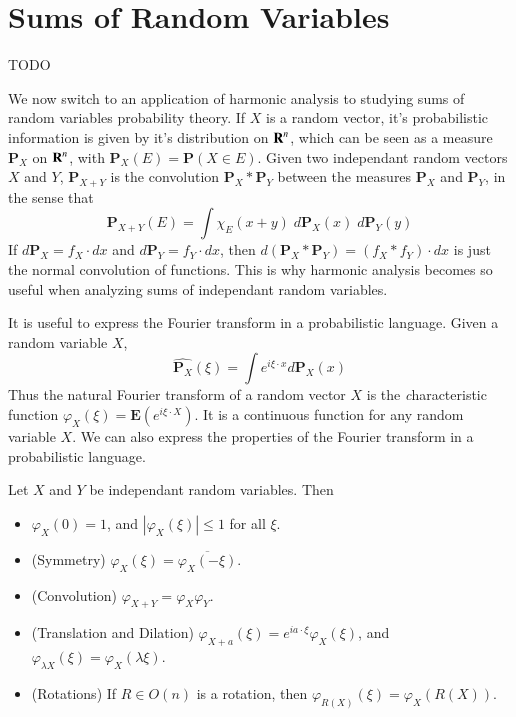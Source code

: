 \section{Sums of Random Variables}

TODO

We now switch to an application of harmonic analysis to studying sums of random variables probability theory. If $X$ is a random vector, it's probabilistic information is given by it's distribution on $\operatorname{\mathbf{R}}^n$, which can be seen as a measure $\mathbf{P}_X$ on $\operatorname{\mathbf{R}}^n$, with $\mathbf{P}_X(E) = \mathbf{P}(X \in E)$. Given two independant random vectors $X$ and $Y$, $\mathbf{P}_{X+Y}$ is the convolution $\mathbf{P}_X * \mathbf{P}_Y$ between the measures $\mathbf{P}_X$ and $\mathbf{P}_Y$, in the sense that
%
\[ \mathbf{P}_{X+Y}(E) = \int \chi_E(x+y)\; d\mathbf{P}_X(x)\; d\mathbf{P}_Y(y) \]
%
If $d\mathbf{P}_X = f_X \cdot dx$ and $d\mathbf{P}_Y = f_Y \cdot dx$, then $d(\mathbf{P}_X * \mathbf{P}_Y) = (f_X * f_Y) \cdot dx$ is just the normal convolution of functions. This is why harmonic analysis becomes so useful when analyzing sums of independant random variables.

It is useful to express the Fourier transform in a probabilistic language. Given a random variable $X$,
%
\[ \widehat{\mathbf{P}_X}(\xi) = \int e^{i \xi \cdot x} d\mathbf{P}_X(x) \]
%
Thus the natural Fourier transform of a random vector $X$ is the {\emph characteristic function} $\varphi_X(\xi) = \mathbf{E}(e^{i \xi \cdot X})$. It is a continuous function for any random variable $X$. We can also express the properties of the Fourier transform in a probabilistic language.

\begin{lemma}
    Let $X$ and $Y$ be independant random variables. Then
    \begin{itemize}
        \item $\varphi_X(0) = 1$, and $|\varphi_X(\xi)| \leq 1$ for all $\xi$.

        \item (Symmetry) $\varphi_X(\xi) = \overline{\varphi_X(-\xi)}$.

        \item (Convolution) $\varphi_{X+Y} = \varphi_X \varphi_Y$.

        \item (Translation and Dilation) $\varphi_{X+a}(\xi) = e^{i a \cdot \xi} \varphi_X(\xi)$, and $\varphi_{\lambda X}(\xi) = \varphi_X(\lambda \xi)$.

        \item (Rotations) If $R \in O(n)$ is a rotation, then $\varphi_{R(X)}(\xi) = \varphi_X(R(X))$.
    \end{itemize}
\end{lemma}

